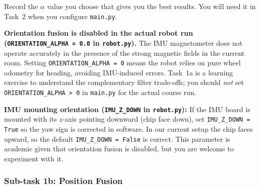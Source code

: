 \documentclass[12pt,letterpaper]{article}
\begin{document}

\begin{notebox}
  Record the $\alpha$ value you choose that gives you the best results. You will need it in Task~2 when you
  configure \texttt{main.py}.
\end{notebox}

\begin{warningbox}
  \textbf{Orientation fusion is disabled in the actual robot run
  (\texttt{ORIENTATION\_ALPHA = 0.0} in \texttt{robot.py}).}
  The IMU magnetometer does not operate accurately in the presence of the
  strong magnetic fields in
  the current room.  Setting \texttt{ORIENTATION\_ALPHA = 0} means the robot
  relies on pure wheel odometry for heading, avoiding IMU-induced errors.
  Task~1a is a learning exercise to understand the complementary filter
  trade-offs; you should \emph{not} set \texttt{ORIENTATION\_ALPHA > 0} in
  \texttt{main.py} for the actual course run.
\end{warningbox}

\begin{notebox}
  \textbf{IMU mounting orientation (\texttt{IMU\_Z\_DOWN} in
  \texttt{robot.py}):} If the IMU board is mounted with its $z$-axis pointing
  downward (chip face down), set \texttt{IMU\_Z\_DOWN = True} so the yaw sign
  is corrected in software.  In our current setup the chip faces upward, so
  the default \texttt{IMU\_Z\_DOWN = False} is correct.  This parameter is
  academic given that orientation fusion is disabled, but you are welcome to
  experiment with it.
\end{notebox}

\subsubsection{Sub-task 1b: Position Fusion}
\end{document}

